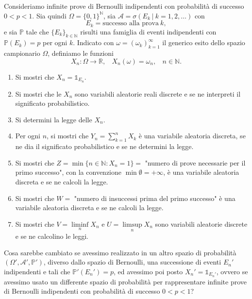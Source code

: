 Consideriamo infinite prove di Bernoulli indipendenti con probabilità di successo $0< p< 1$. Sia quindi $\Omega =\{0,1\}^{\mathbb{N}}$, sia $\mathcal{A} =\sigma ( E_{k} \ |\ k=1,2,\dotsc )$ con
\begin{equation*}
E_{k} =\text{successo alla prova} \ k,
\end{equation*}
e sia $\mathbb{P}$ tale che $\{E_{k}\}_{k\in \mathbb{N}}$ risulti una famiglia di eventi indipendenti con $\mathbb{P}( E_{k}) =p$ per ogni $k$. Indicato con $\omega =( \omega _{k})_{k=1}^{\infty }$ il generico esito dello spazio campionario $\Omega $, definiamo le funzioni
\begin{equation*}
X_{n} :\Omega \rightarrow \mathbb{R} ,\ \ \ \ X_{n}( \omega ) =\omega _{n} ,\ \ \ \ n\in \mathbb{N} .
\end{equation*}
\begin{enumerate}
\item Si mostri che $X_{n} =\mathbb{1}_{E_{n}}$.
\item Si mostri che le $X_{n}$ sono variabili aleatorie reali discrete e se ne interpreti il significato probabilistico.
\item Si determini la legge delle $X_{n}$.
\item Per ogni $n$, si mostri che $Y_{n} =\sum\nolimits _{k=1}^{n} X_{k}$ è una variabile aleatoria discreta, se ne dia il significato probabilistico e se ne determini la legge.
\item Si mostri che $Z=\min\{n\in \mathbb{N} :X_{n} =1\} =$ "numero di prove necessarie per il primo successo", con la convenzione $\min \emptyset =+\infty $, è una variabile aleatoria discreta e se ne calcoli la legge.
\item Si mostri che $W=$ "numero di insuccessi prima del primo successo" è una variabile aleatoria discreta e se ne calcoli la legge.
\item Si mostri che $V=\liminf\limits _{n} X_{n}$ e $U=\limsup\limits _{n} X_{n}$ sono variabili aleatorie discrete e se ne calcolino le leggi.
\end{enumerate}

Cosa sarebbe cambiato se avessimo realizzato in un altro spazio di probabilità $( \Omega \prime ,\mathcal{A} \prime ,\mathbb{P} \prime )$, diverso dallo spazio di Bernoulli, una successione di eventi $E_{n} \prime $ indipendenti e tali che $\mathbb{P} \prime ( E_{n} \prime ) =p$, ed avessimo poi posto $X_{n} \prime =\mathbb{1}_{E_{n} \prime }$, ovvero se avessimo usato un differente spazio di probabilità per rappresentare infinite prove di Bernoulli indipendenti con probabilità di successo $0< p< 1$?
